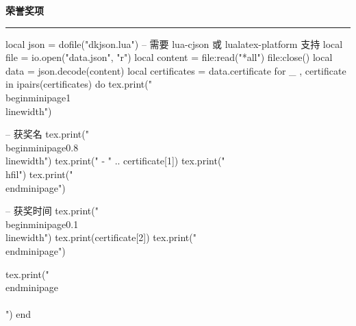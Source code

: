 \documentclass[10pt, a4paper, oneside]{ctexart}
\begin{document}
\ifdefined\certificate
\begin{minipage}{1\textwidth}
    \large{\ifdefined\showIcon \makebox[\iconAlignWide][c]{\faAward} \fi \textbf{荣誉奖项}}
\end{minipage}
\rule{\linewidth}{\lineSize}
\begin{center}
    \begin{minipage}{0.9\textwidth}
        \begin{luacode}
            local json = dofile("dkjson.lua")  -- 需要 lua-cjson 或 lualatex-platform 支持
            local file = io.open("data.json", "r")
            local content = file:read("*all")
            file:close()
            local data = json.decode(content)
            local certificates = data.certificate
            for _ , certificate in ipairs(certificates) do
                tex.print("\\begin{minipage}{1\\linewidth}")

                -- 获奖名
                tex.print("\\begin{minipage}{0.8\\linewidth}")
                tex.print(" - " .. certificate[1])
                tex.print("\\hfil")
                tex.print("\\end{minipage}")

                -- 获奖时间
                tex.print("\\begin{minipage}{0.1\\linewidth}")
                tex.print(certificate[2])
                tex.print("\\end{minipage}")

                tex.print("\\end{minipage}\\\\[0.5em]")
            end
        \end{luacode}
    \end{minipage}
\end{center}
\fi
\end{document}
